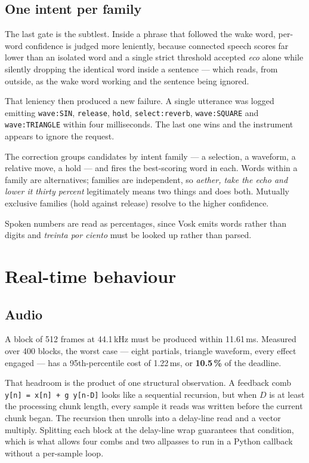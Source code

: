 \documentclass[a4paper,11pt]{article}
\newcommand{\code}[1]{\texttt{\small #1}}
\begin{document}
\subsection{One intent per family}

The last gate is the subtlest. Inside a phrase that followed the wake word,
per-word confidence is judged more leniently, because connected speech scores
far lower than an isolated word and a single strict threshold accepted
\emph{eco} alone while silently dropping the identical word inside a sentence
--- which reads, from outside, as the wake word working and the sentence being
ignored.

That leniency then produced a new failure. A single utterance was logged
emitting \code{wave:SIN}, \code{release}, \code{hold}, \code{select:reverb},
\code{wave:SQUARE} and \code{wave:TRIANGLE} within four milliseconds. The last
one wins and the instrument appears to ignore the request.

The correction groups candidates by intent family --- a selection, a waveform,
a relative move, a hold --- and fires the best-scoring word in each. Words
within a family are alternatives; families are independent, so
\emph{aether, take the echo and lower it thirty percent} legitimately means two
things and does both. Mutually exclusive families (hold against release) resolve
to the higher confidence.

Spoken numbers are read as percentages, since Vosk emits words rather than
digits and \emph{treinta por ciento} must be looked up rather than parsed.

\section{Real-time behaviour}

\subsection{Audio}

A block of 512 frames at 44.1\,kHz must be produced within 11.61\,ms. Measured
over 400 blocks, the worst case --- eight partials, triangle waveform, every
effect engaged --- has a 95th-percentile cost of 1.22\,ms, or \textbf{10.5\,\%}
of the deadline.

That headroom is the product of one structural observation. A feedback comb
\code{y[n] = x[n] + g\,y[n-D]} looks like a sequential recursion, but when $D$
is at least the processing chunk length, every sample it reads was written
before the current chunk began. The recursion then unrolls into a delay-line
read and a vector multiply. Splitting each block at the delay-line wrap
guarantees that condition, which is what allows four combs and two allpasses to
run in a Python callback without a per-sample loop.
\end{document}
